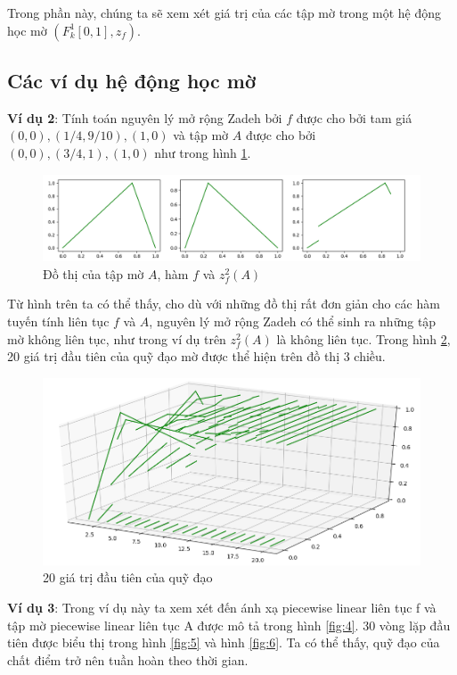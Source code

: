 \documentclass[../report.tex]{subfiles}
\begin{document}
Trong phần này, chúng ta sẽ xem xét giá trị của các 
tập mờ trong một hệ động học mờ $(F_k^1[0, 1], z_f)$. \\
\subsection{Các ví dụ hệ động học mờ}

\noindent \textbf{Ví dụ 2}: Tính toán nguyên lý mở rộng Zadeh bởi $f$ được 
cho bởi tam giá $(0, 0), (1/4, 9/10), (1, 0)$
và tập mờ $A$ được cho bởi $(0, 0), (3/4, 1), (1, 0)$ như trong 
hình \ref{fig:2}.
\begin{figure}[H]
\includegraphics[width=\textwidth]{figures/example2.png}
\caption{Đồ thị của tập mờ $A$, hàm $f$ và $z_f^2(A)$}
\label{fig:2}
\end{figure}

Từ hình trên ta có thể thấy, cho dù với những đồ thị rất đơn giản cho 
các hàm tuyến tính liên tục $f$ và $A$, nguyên lý mở rộng Zadeh 
có thể sinh ra những tập mờ không liên tục, như trong ví dụ trên
$z_f^2(A)$ là không liên tục. Trong hình \ref{fig:3}, 20 giá trị đầu tiên
của quỹ đạo mờ được thể hiện trên đồ thị 3 chiều. 

\begin{figure}[H]
\includegraphics[width=\textwidth]{figures/example2_3d.png}
\caption{20 giá trị đầu tiên của quỹ đạo}
\label{fig:3}
\end{figure}

\noindent \textbf{Ví dụ 3}: Trong ví dụ này ta xem xét đến ánh 
xạ piecewise linear liên tục f và tập mờ piecewise linear 
liên tục A được mô tả trong hình \ref{fig:4}. 30 vòng lặp đầu 
tiên được biểu thị trong hình \ref{fig:5} và hình \ref{fig:6}.
Ta có thể thấy, quỹ đạo của chất điểm trở nên tuần hoàn theo 
thời gian. 
\end{document}
